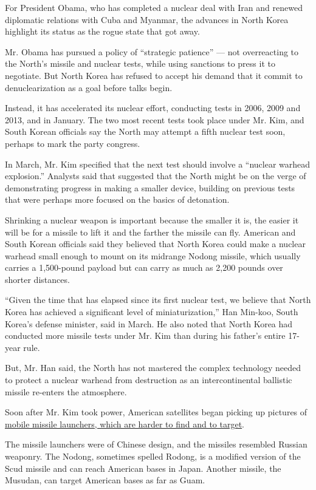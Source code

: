 For President Obama, who has completed a nuclear deal with Iran and
renewed diplomatic relations with Cuba and Myanmar, the advances in
North Korea highlight its status as the rogue state that got away.

Mr. Obama has pursued a policy of ``strategic patience'' --- not
overreacting to the North's missile and nuclear tests, while using
sanctions to press it to negotiate. But North Korea has refused to
accept his demand that it commit to denuclearization as a goal before
talks begin.

Instead, it has accelerated its nuclear effort, conducting tests in
2006, 2009 and 2013, and in January. The two most recent tests took
place under Mr. Kim, and South Korean officials say the North may
attempt a fifth nuclear test soon, perhaps to mark the party congress.

In March, Mr. Kim specified that the next test should involve a
``nuclear warhead explosion.'' Analysts said that suggested that the
North might be on the verge of demonstrating progress in making a
smaller device, building on previous tests that were perhaps more
focused on the basics of detonation.

Shrinking a nuclear weapon is important because the smaller it is, the
easier it will be for a missile to lift it and the farther the missile
can fly. American and South Korean officials said they believed that
North Korea could make a nuclear warhead small enough to mount on its
midrange Nodong missile, which usually carries a 1,500-pound payload but
can carry as much as 2,200 pounds over shorter distances.

``Given the time that has elapsed since its first nuclear test, we
believe that North Korea has achieved a significant level of
miniaturization,'' Han Min-koo, South Korea's defense minister, said in
March. He also noted that North Korea had conducted more missile tests
under Mr. Kim than during his father's entire 17-year rule.

But, Mr. Han said, the North has not mastered the complex technology
needed to protect a nuclear warhead from destruction as an
intercontinental ballistic missile re-enters the atmosphere.

Soon after Mr. Kim took power, American satellites began picking up
pictures of
\href{http://www.nytimes3xbfgragh.onion/2013/01/18/world/asia/north-koreas-missile-movements-worry-us.html}{mobile
missile launchers, which are harder to find and to target}.

The missile launchers were of Chinese design, and the missiles resembled
Russian weaponry. The Nodong, sometimes spelled Rodong, is a modified
version of the Scud missile and can reach American bases in Japan.
Another missile, the Musudan, can target American bases as far as Guam.

